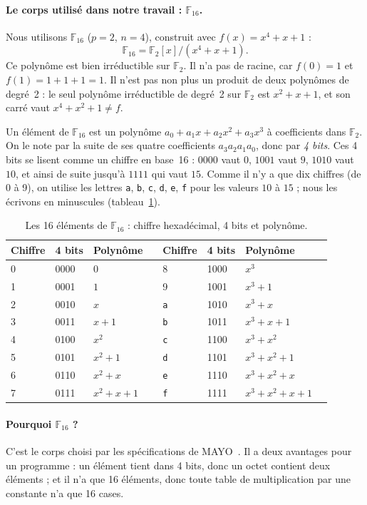 \paragraph{Le corps utilisé dans notre travail : $\mathbb{F}_{16}$.} Nous utilisons $\mathbb{F}_{16}$ ($p=2$, $n=4$), construit avec $f(x)=x^4+x+1$ :
\[\mathbb{F}_{16}=\mathbb{F}_2[x]/(x^4+x+1).\]
Ce polynôme est bien irréductible sur $\mathbb{F}_2$. Il n'a pas de racine, car $f(0)=1$ et $f(1)=1+1+1=1$. Il n'est pas non plus un produit de deux polynômes de degré~2 : le seul polynôme irréductible de degré~2 sur $\mathbb{F}_2$ est $x^2+x+1$, et son carré vaut $x^4+x^2+1\neq f$.

Un élément de $\mathbb{F}_{16}$ est un polynôme $a_0+a_1x+a_2x^2+a_3x^3$ à coefficients dans $\mathbb{F}_2$. On le note par la suite de ses quatre coefficients $a_3a_2a_1a_0$, donc par \emph{4 bits}. Ces 4 bits se lisent comme un chiffre en base~16 : $0000$ vaut $0$, $1001$ vaut $9$, $1010$ vaut $10$, et ainsi de suite jusqu'à $1111$ qui vaut $15$. Comme il n'y a que dix chiffres (de 0 à 9), on utilise les lettres \texttt{a}, \texttt{b}, \texttt{c}, \texttt{d}, \texttt{e}, \texttt{f} pour les valeurs $10$ à $15$ ; nous les écrivons en minuscules (tableau~\ref{tab:f16}).

\begin{table}[ht]\centering\small
\caption{Les 16 éléments de $\mathbb{F}_{16}$ : chiffre hexadécimal, 4 bits et polynôme.}\label{tab:f16}
\begin{tabular}{@{}llll@{\qquad}llll@{}}\toprule
Chiffre & 4 bits & Polynôme & & Chiffre & 4 bits & Polynôme\\\midrule
0&0000&$0$ & & 8&1000&$x^3$\\
1&0001&$1$ & & 9&1001&$x^3+1$\\
2&0010&$x$ & & \texttt{a}&1010&$x^3+x$\\
3&0011&$x+1$ & & \texttt{b}&1011&$x^3+x+1$\\
4&0100&$x^2$ & & \texttt{c}&1100&$x^3+x^2$\\
5&0101&$x^2+1$ & & \texttt{d}&1101&$x^3+x^2+1$\\
6&0110&$x^2+x$ & & \texttt{e}&1110&$x^3+x^2+x$\\
7&0111&$x^2+x+1$ & & \texttt{f}&1111&$x^3+x^2+x+1$\\\bottomrule
\end{tabular}
\end{table}

\paragraph{Pourquoi $\mathbb{F}_{16}$ ?} C'est le corps choisi par les spécifications de MAYO~\cite{mayo}. Il a deux avantages pour un programme : un élément tient dans 4 bits, donc un octet contient deux éléments ; et il n'a que 16 éléments, donc toute table de multiplication par une constante n'a que 16 cases.

